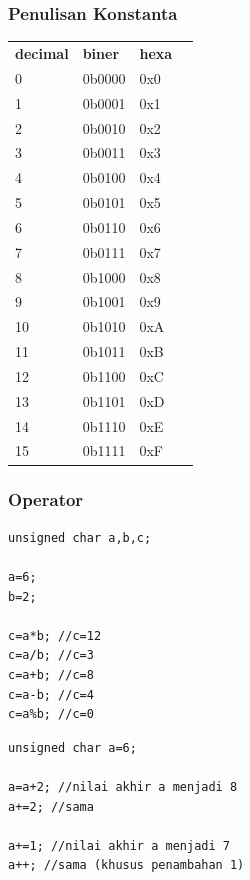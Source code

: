 \documentclass[12pt,]{article}
\begin{document}
	\subsubsection{Penulisan Konstanta}
	\begin{table}[H]
		\begin{tabular}{|l|l|l|l}
			\cline{1-3}
			\textbf{decimal} & \textbf{biner} & \textbf{hexa} \\ \cline{1-3}
			0 & 0b0000 & 0x0  \\ \cline{1-3}
			1 & 0b0001 & 0x1  \\ \cline{1-3}
			2 & 0b0010 & 0x2  \\ \cline{1-3}
			3 & 0b0011 & 0x3  \\ \cline{1-3}
			4 & 0b0100 & 0x4  \\ \cline{1-3}
			5 & 0b0101 & 0x5  \\ \cline{1-3}
			6 & 0b0110 & 0x6  \\ \cline{1-3}
			7 & 0b0111 & 0x7  \\ \cline{1-3}
			8 & 0b1000 & 0x8  \\ \cline{1-3}
			9 & 0b1001 & 0x9  \\ \cline{1-3}
			10 & 0b1010 & 0xA  \\ \cline{1-3}
			11 & 0b1011 & 0xB  \\ \cline{1-3}
			12 & 0b1100 & 0xC  \\ \cline{1-3}
			13 & 0b1101 & 0xD  \\ \cline{1-3}
			14 & 0b1110 & 0xE  \\ \cline{1-3}
			15 & 0b1111 & 0xF  \\ \cline{1-3}
		\end{tabular}
	\end{table}

	\subsubsection{Operator}
	\begin{verbatim}
unsigned char a,b,c;

a=6;
b=2;

c=a*b; //c=12
c=a/b; //c=3
c=a+b; //c=8
c=a-b; //c=4
c=a%b; //c=0
	\end{verbatim}

	\begin{verbatim}
unsigned char a=6;

a=a+2; //nilai akhir a menjadi 8
a+=2; //sama

a+=1; //nilai akhir a menjadi 7
a++; //sama (khusus penambahan 1)
	\end{verbatim}
\end{document}
